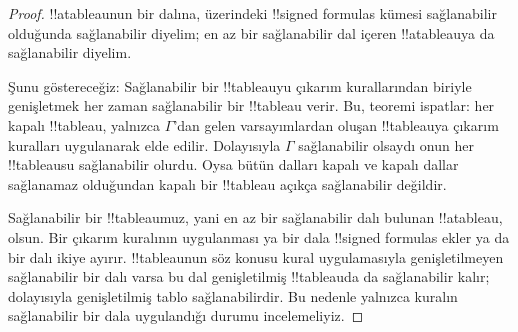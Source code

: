 \begin{proof}
!!a{tableau}{}nun bir dalına, üzerindeki !!{signed formula}s kümesi
sağlanabilir olduğunda sağlanabilir diyelim; en az bir sağlanabilir dal içeren
!!a{tableau}{}ya da sağlanabilir diyelim.

Şunu göstereceğiz: Sağlanabilir bir !!{tableau}{}yu çıkarım kurallarından
biriyle genişletmek her zaman sağlanabilir bir !!{tableau} verir. Bu, teoremi
ispatlar: her kapalı !!{tableau}, yalnızca $\Gamma$'dan gelen varsayımlardan
oluşan !!{tableau}{}ya çıkarım kuralları uygulanarak elde edilir. Dolayısıyla
$\Gamma$ sağlanabilir olsaydı onun her !!{tableau}{}su sağlanabilir olurdu.
Oysa bütün dalları kapalı ve kapalı dallar sağlanamaz olduğundan kapalı bir
!!{tableau} açıkça sağlanabilir değildir.

Sağlanabilir bir !!{tableau}{}muz, yani en az bir sağlanabilir dalı bulunan
!!a{tableau}, olsun.
Bir çıkarım kuralının uygulanması ya bir dala !!{signed formula}s ekler ya da
bir dalı ikiye ayırır. !!{tableau}{}nun söz konusu kural uygulamasıyla
genişletilmeyen sağlanabilir bir dalı varsa bu dal genişletilmiş !!{tableau}{}da
da sağlanabilir kalır; dolayısıyla genişletilmiş tablo sağlanabilirdir. Bu
nedenle yalnızca kuralın sağlanabilir bir dala uygulandığı durumu incelemeliyiz.


\end{proof}
